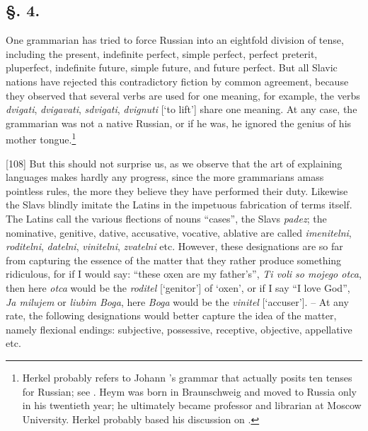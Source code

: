 \subsection*{\hspace*{\fill}§. 4.\hspace*{\fill}}

One grammarian has tried to force Russian into an eightfold division of tense, including the present, indefinite perfect, simple perfect, perfect preterit, pluperfect, indefinite future, simple future, and future perfect. But all Slavic nations have rejected this contradictory fiction by common agreement, because they observed that several verbs are used for one meaning, for example, the verbs \textit{dvigati}, \textit{dvigavati}, \textit{sdvigati}, \textit{dvignuti} [‘to lift’] share one meaning. At any case, the grammarian was not a native Russian, or if he was, he ignored the genius of his mother tongue.\footnote{Herkel probably refers to Johann \citeauthor{heym_russische_1794}’s \citeyear{heym_russische_1794} grammar that actually posits ten tenses for Russian; see \citet[92--94]{heym_russische_1794}. Heym was born in Braunschweig and moved to Russia only in his twentieth year; he ultimately became professor and librarian at Moscow University. Herkel probably based his discussion on \citet[303]{kopitar_grammatik_1808}.}

[108] But this should not surprise us, as we observe that the art of explaining languages makes hardly any progress, since the more grammarians amass pointless rules, the more they believe they have performed their duty. Likewise the Slavs blindly imitate the Latins in the impetuous fabrication of terms itself. The Latins call the various flections of nouns “cases”, the Slavs \textit{padez}; the nominative, genitive, dative, accusative, vocative, ablative are called \textit{imenitelni}, \textit{roditelni}, \textit{datelni}, \textit{vinitelni}, \textit{zvatelni} etc. However, these designations are so far from capturing the essence of the matter that they rather produce something ridiculous, for if I would say: “these oxen are my father’s”, \textit{Ti voli so mojego otca}, then here \textit{otca} would be the \textit{roditel} [‘genitor’] of ‘oxen’, or if I say “I love God”, \textit{Ja milujem} or \textit{liubim Boga}, here \textit{Boga} would be the \textit{vinitel} [‘accuser’]. -- At any rate, the following designations would better capture the idea of the matter, namely flexional endings: subjective, possessive, receptive, objective, appellative etc.

